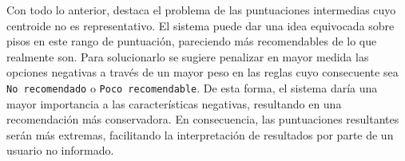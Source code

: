 \documentclass[12pt]{report} %
\begin{document}
    Con todo lo anterior, destaca el problema de las puntuaciones intermedias
    cuyo centroide no es representativo. El sistema puede dar una idea
    equivocada sobre pisos en este rango de puntuación, pareciendo más
    recomendables de lo que realmente son. Para solucionarlo se sugiere
    penalizar en mayor medida las opciones negativas a través de un mayor peso
    en las reglas cuyo consecuente sea \texttt{No recomendado} o \texttt{Poco
    recomendable}. De esta forma, el sistema daría una mayor importancia a las
    características negativas, resultando en una recomendación más
    conservadora. En consecuencia, las puntuaciones resultantes serán más
    extremas, facilitando la interpretación de resultados por parte de un
    usuario no informado.



    \clearpage

    \label{chap:bibliography}
    \printbibliography


\end{document}
